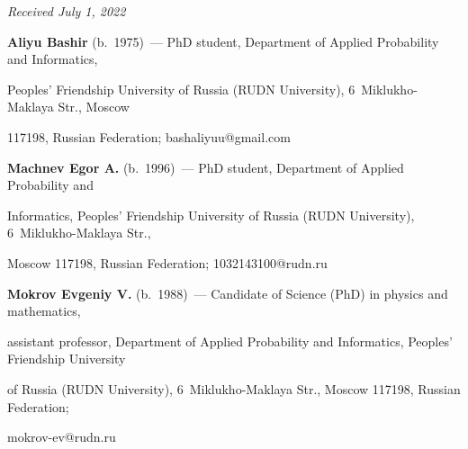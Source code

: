 \vspace*{-6pt}





\hfill{\small\textit{Received July 1, 2022}}





\Contr





\noindent


\textbf{Aliyu Bashir} (b.\ 1975)~--- PhD student, Department of Applied Probability and Informatics, 


Peoples' Friendship University of Russia (RUDN University), 6~Miklukho-Maklaya Str., Moscow 


117198, Russian Federation; \mbox{bashaliyuu@gmail.com}





\vspace*{4pt}





\noindent


\textbf{Machnev Egor A.} (b.\ 1996)~--- PhD student, Department of Applied Probability and 


Informatics, Peoples' Friendship University of Russia (RUDN University), 6~Miklukho-Maklaya Str., 


Moscow 117198, Russian Federation; \mbox{1032143100@rudn.ru}





\vspace*{4pt}





\noindent


\textbf{Mokrov Evgeniy V.} (b.\ 1988)~--- Candidate of Science (PhD) in physics and mathematics, 


assistant professor, Department of Applied Probability and Informatics, Peoples' Friendship University 


of Russia (RUDN University), 6~Miklukho-Maklaya Str., Moscow 117198, Russian Federation; 


\mbox{mokrov-ev@rudn.ru}


\label{end\stat}





\renewcommand{\bibname}{\protect\rm Литература}    


